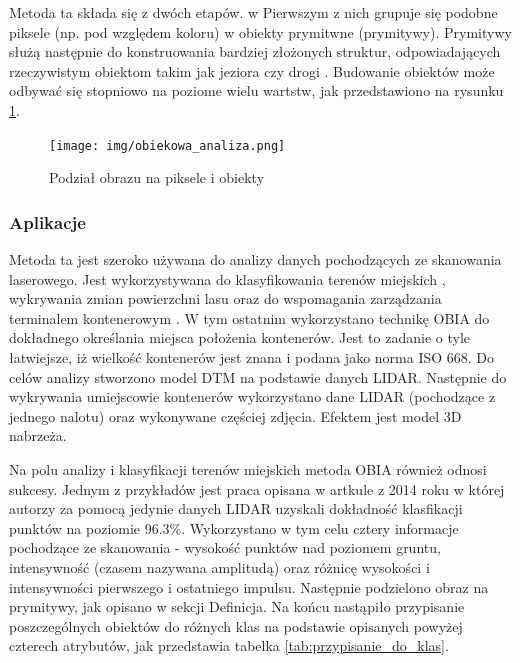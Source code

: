 Metoda ta składa się z dwóch etapów. w Pierwszym z nich grupuje się podobne piksele (np. pod względem koloru) w obiekty prymitwne (prymitywy). Prymitywy służą następnie do konstruowania bardziej złożonych 
struktur, odpowiadających rzeczywistym obiektom takim jak jeziora czy drogi \cite{Blaschke2014}.  Budowanie obiektów może odbywać się stopniowo na poziome wielu wartstw, jak przedstawiono na rysunku
\ref{fig:poziomy_struktury}.

\begin{figure}[h!]
    \centering
    \texttt{[image: img/obiekowa\_analiza.png]}
    \caption{Podział obrazu na piksele i obiekty}
    \label{fig:poziomy_struktury}
\end{figure}

\subsubsection{Aplikacje}
Metoda ta jest szeroko używana do analizy danych pochodzących ze skanowania laserowego. Jest wykorzystywana do klasyfikowania terenów miejskich \cite{zhou2013,chen2014},
wykrywania zmian powierzchni lasu \cite{zhang2014} oraz do wspomagania zarządzania terminalem kontenerowym \cite{tiede2015}. W tym ostatnim wykorzystano technikę OBIA do dokładnego określania miejsca położenia
kontenerów. Jest to zadanie o tyle łatwiejsze, iż wielkość kontenerów jest znana i podana jako norma ISO 668. Do celów analizy stworzono model DTM na podstawie danych LIDAR. Następnie do wykrywania
umiejscowie kontenerów wykorzystano dane LIDAR (pochodzące z jednego nalotu) oraz wykonywane częściej zdjęcia. Efektem jest model 3D nabrzeża.

Na polu analizy i klasyfikacji terenów miejskich metoda OBIA również odnosi sukcesy. Jednym z przykładów jest praca opisana w artkule z 2014 roku \cite{chen2014} w której autorzy za pomocą jedynie
danych LIDAR uzyskali dokładność klasfikacji punktów na poziomie  96.3\%. Wykorzystano w tym celu cztery informacje pochodzące ze skanowania - wysokość punktów nad poziomem gruntu, intensywność (czasem
nazywana amplitudą) oraz różnicę wysokości i intensywności pierwszego i ostatniego impulsu. Następnie podzielono obraz na prymitywy, jak opisano w sekcji Definicja. Na końcu nastąpiło przypisanie poszczególnych
obiektów do różnych klas na podstawie opisanych powyżej czterech atrybutów, jak przedstawia tabelka \ref{tab:przypisanie_do_klas}.

